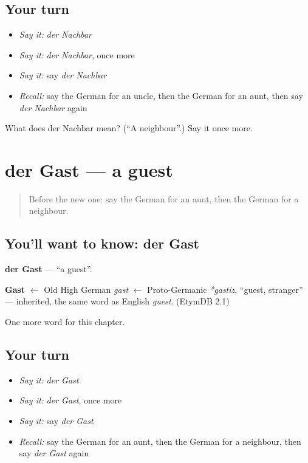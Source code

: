 \subsection*{Your turn}
\begin{itemize}
\raggedright
  \item \emph{Say it:} \emph{der Nachbar}
  \item \emph{Say it:} \emph{der Nachbar}, once more
  \item \emph{Say it:} say \emph{der Nachbar}
  \item \emph{Recall:} say the German for an uncle, then the German for an aunt, then say \emph{der Nachbar} again
\end{itemize}

\begin{tcolorbox}[breakable,colback=teal!4,colframe=teal!35!black,title={Before you move on}]
What does der Nachbar mean? (\textquotedblleft{}A neighbour\textquotedblright{}.) Say it once more.
\end{tcolorbox}
\section[der Gast]{der Gast — a guest}

\label{lesson:GE-C63-gast}



\begin{quote}
Before the new one: say the German for an aunt, then the German for a neighbour.
\end{quote}

\subsection*{You'll want to know: der Gast}
\textbf{der Gast} — \textquotedblleft{}a guest\textquotedblright{}.

\begin{cousinweb}
\textbf{Gast} $\leftarrow$ Old High German \emph{gast} $\leftarrow$ Proto-Germanic \emph{*gastiz}, \textquotedblleft{}guest, stranger\textquotedblright{} — inherited, the same word as English \emph{guest}. (EtymDB 2.1)
\end{cousinweb}

\begin{grammarlens}[title={What you've built}]
One more word for this chapter.
\end{grammarlens}

\subsection*{Your turn}
\begin{itemize}
\raggedright
  \item \emph{Say it:} \emph{der Gast}
  \item \emph{Say it:} \emph{der Gast}, once more
  \item \emph{Say it:} say \emph{der Gast}
  \item \emph{Recall:} say the German for an aunt, then the German for a neighbour, then say \emph{der Gast} again
\end{itemize}

